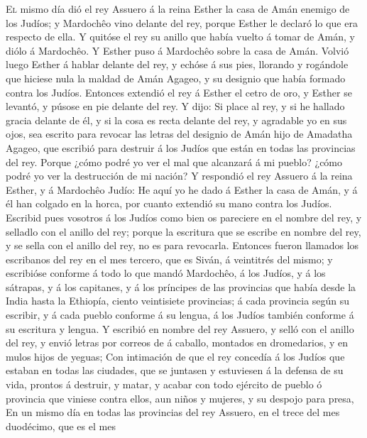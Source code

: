  \textsc{El} mismo día dió el rey Assuero á la reina
Esther la casa de Amán enemigo de los Judíos; y Mardochêo vino delante
del rey, porque Esther le declaró lo que era respecto de ella.
 Y quitóse el rey su anillo que había vuelto á tomar de
Amán, y diólo á Mardochêo. Y Esther puso á Mardochêo sobre la casa de
Amán.  Volvió luego Esther á hablar delante del rey, y
echóse á sus pies, llorando y rogándole que hiciese nula la maldad de
Amán Agageo, y su designio que había formado contra los Judíos.
 Entonces extendió el rey á Esther el cetro de oro, y
Esther se levantó, y púsose en pie delante del rey.  Y
dijo: Si place al rey, y si he hallado gracia delante de él, y si la
cosa es recta delante del rey, y agradable yo en sus ojos, sea escrito
para revocar las letras del designio de Amán hijo de Amadatha Agageo,
que escribió para destruir á los Judíos que están en todas las
provincias del rey.  Porque ¿cómo podré yo ver el mal que
alcanzará á mi pueblo? ¿cómo podré yo ver la destrucción de mi nación?
 Y respondió el rey Assuero á la reina Esther, y á
Mardochêo Judío: He aquí yo he dado á Esther la casa de Amán, y á él han
colgado en la horca, por cuanto extendió su mano contra los Judíos.
 Escribid pues vosotros á los Judíos como bien os
pareciere en el nombre del rey, y selladlo con el anillo del rey; porque
la escritura que se escribe en nombre del rey, y se sella con el anillo
del rey, no es para revocarla.  Entonces fueron llamados
los escribanos del rey en el mes tercero, que es Siván, á veintitrés del
mismo; y escribióse conforme á todo lo que mandó Mardochêo, á los
Judíos, y á los sátrapas, y á los capitanes, y á los príncipes de las
provincias que había desde la India hasta la Ethiopía, ciento
veintisiete provincias; á cada provincia según su escribir, y á cada
pueblo conforme á su lengua, á los Judíos también conforme á su
escritura y lengua.  Y escribió en nombre del rey
Assuero, y selló con el anillo del rey, y envió letras por correos de á
caballo, montados en dromedarios, y en mulos hijos de yeguas;
 Con intimación de que el rey concedía á los Judíos que
estaban en todas las ciudades, que se juntasen y estuviesen á la defensa
de su vida, prontos á destruir, y matar, y acabar con todo ejército de
pueblo ó provincia que viniese contra ellos, aun niños y mujeres, y su
despojo para presa,  En un mismo día en todas las
provincias del rey Assuero, en el trece del mes duodécimo, que es el mes
